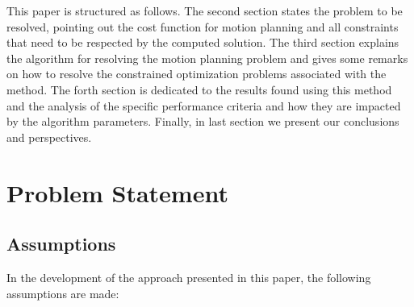 \documentclass[eprint]{actapoly}
\begin{document}


 


This paper is structured as follows. The second section states the problem to
be resolved, pointing out the cost function for motion planning and all constraints
that need to be respected by the computed solution.
The third section explains the algorithm for resolving the motion planning problem and gives
some remarks on how to resolve the constrained optimization problems associated
with the method.
The forth section is dedicated to the results found using
this method and the analysis of the specific performance criteria and 
how they are impacted by the algorithm parameters.
Finally, in last section we present our conclusions and perspectives.


\section{Problem Statement}\label{sec:problem}

\subsection{Assumptions}
In the development of the approach presented in this paper, the following assumptions are made:
\end{document}
